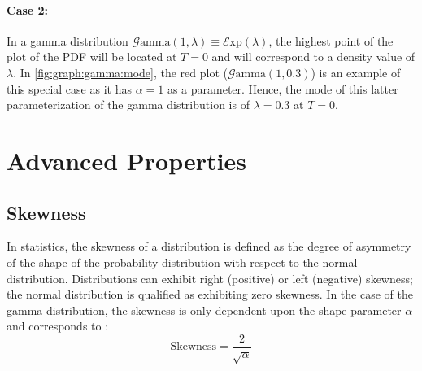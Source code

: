 \documentclass[12pt]{article}
\newcommand{\E}{\mathcal{E}}
\newcommand{\G}{\mathcal{G}}
\begin{document}
\paragraph{Case 2:}
In a gamma distribution $\G\text{amma}(1, \lambda)\equiv\E\text{xp}(\lambda)$, the highest point of the plot of the PDF
will be located at $T=0$ and will correspond to a density value of $\lambda$. In \autoref{fig:graph:gamma:mode}, the red
plot ($\G\text{amma}(1, 0.3)$) is an example of this special case as it has $\alpha=1$ as a parameter. Hence, the mode
of this latter parameterization of the gamma distribution is of $\lambda=0.3$ at $T=0$.


\pagebreak
\section{Advanced Properties}
\subsection{Skewness}
In statistics, the skewness of a distribution is defined as the degree of asymmetry of the shape of the probability
distribution with respect to the normal distribution. Distributions can exhibit right (positive) or left (negative)
skewness; the normal distribution is qualified as exhibiting zero skewness. In the case of the gamma distribution, the
skewness is only dependent upon the shape parameter $\alpha$ and corresponds to\cite{chenLearnSkewness2021,
wikipediaGammaDistribution2022} :
\begin{equation}
	\text{Skewness} = \frac{2}{\sqrt{\alpha}}
\end{equation}
\end{document}
